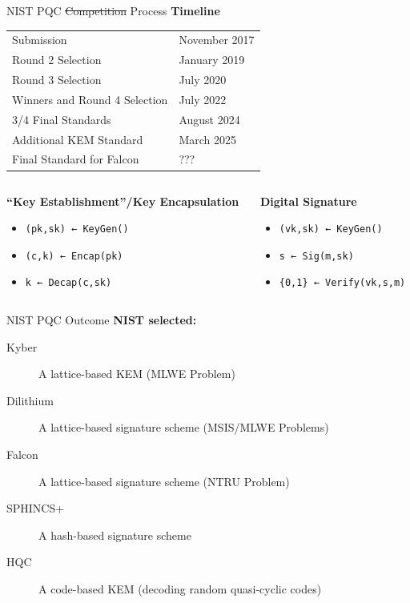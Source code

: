 \documentclass[xcolor=table,10pt,aspectratio=169]{beamer}
\begin{document}
\begin{frame}[label={sec:org6770a75},fragile]{NIST PQC \sout{Competition} Process}
 \textbf{Timeline}

\begin{center}
\begin{tabular}{ll}
\toprule
Submission & November 2017\\
Round 2 Selection & January 2019\\
Round 3 Selection & July 2020\\
Winners and Round 4 Selection & July 2022\\
3/4 Final Standards & August 2024\\
Additional KEM Standard & March 2025\\
Final Standard for Falcon & ???\\
\bottomrule
\end{tabular}

\end{center}

\vspace{1em}
\begin{columns}[t]
\begin{column}{0.5\columnwidth}
\textbf{“Key Establishment”/Key Encapsulation}

\begin{itemize}
\item \texttt{(pk,sk) ← KeyGen()}
\item \texttt{(c,k) ← Encap(pk)}
\item \texttt{k ← Decap(c,sk)}
\end{itemize}
\end{column}
\begin{column}{0.5\columnwidth}
\textbf{Digital Signature}

\begin{itemize}
\item \texttt{(vk,sk)  ← KeyGen()}
\item \texttt{s  ← Sig(m,sk)}
\item \texttt{\{0,1\}  ← Verify(vk,s,m)}
\end{itemize}
\end{column}
\end{columns}
\end{frame}
\begin{frame}[label={sec:org670ee16}]{NIST PQC Outcome}
\textbf{NIST selected:}

\begin{description}
\item[{Kyber}] A lattice-based KEM (MLWE Problem)
\item[{Dilithium}] A lattice-based signature scheme (MSIS/MLWE Problems)
\item[{Falcon}] A lattice-based signature scheme (NTRU Problem)
\item[{SPHINCS+}] A hash-based signature scheme
\item[{HQC}] A code-based KEM (decoding random quasi-cyclic codes)
\end{description}
\end{frame}
\end{document}

